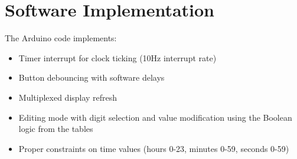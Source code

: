 \section{Software Implementation}
The Arduino code implements:
\begin{itemize}
    \item Timer interrupt for clock ticking (10Hz interrupt rate)
    \item Button debouncing with software delays
    \item Multiplexed display refresh
    \item Editing mode with digit selection and value modification using the Boolean logic from the tables
    \item Proper constraints on time values (hours 0-23, minutes 0-59, seconds 0-59)
\end{itemize}
